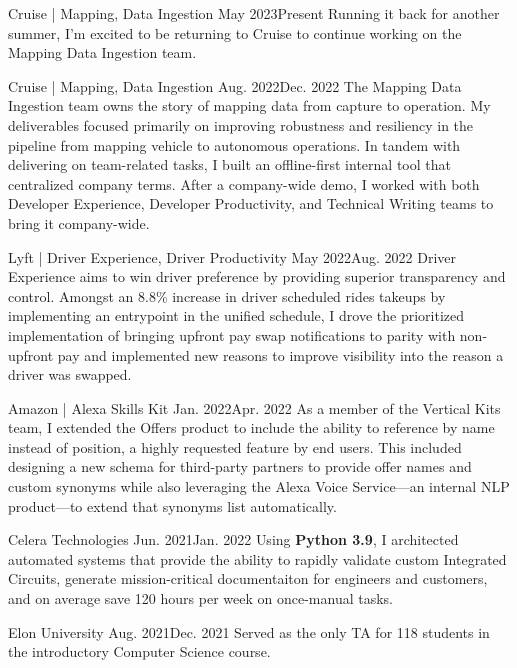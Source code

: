 \documentclass{listofpersonalprofessionalachievements}
\begin{document}
\begin{itemize}
    {Cruise | Mapping, Data Ingestion}
    {May 2023}{Present}
    {Running it back for another summer, I'm excited to be returning to Cruise to continue working on the Mapping Data Ingestion team.}

    {Cruise | Mapping, Data Ingestion}
    {Aug. 2022}{Dec. 2022}
    {The Mapping Data Ingestion team owns the story of mapping data from capture to operation. My deliverables focused primarily on improving robustness and resiliency in the pipeline from mapping vehicle to autonomous operations. In tandem with delivering on team-related tasks, I built an offline-first internal tool that centralized company terms. After a company-wide demo, I worked with both Developer Experience, Developer Productivity, and Technical Writing teams to bring it company-wide.}

    {Lyft | Driver Experience, Driver Productivity}
    {May 2022}{Aug. 2022}
    {Driver Experience aims to win driver preference by providing superior transparency and control. Amongst an 8.8\% increase in driver scheduled rides takeups by implementing an entrypoint in the unified schedule, I drove the prioritized implementation of bringing upfront pay swap notifications to parity with non-upfront pay and implemented new reasons to improve visibility into the reason a driver was swapped.}

    {Amazon | Alexa Skills Kit}
    {Jan. 2022}{Apr. 2022}
    {As a member of the Vertical Kits team, I extended the Offers product to include the ability to reference by name instead of position, a highly requested feature by end users. This included designing a new schema for third-party partners to provide offer names and custom synonyms while also leveraging the Alexa Voice Service—an internal NLP product—to extend that synonyms list automatically.}

    {Celera Technologies}
    {Jun. 2021}{Jan. 2022}
    {Using \textbf{Python 3.9}, I architected automated systems that provide the ability to rapidly validate custom Integrated Circuits, generate mission-critical documentaiton for engineers and customers, and on average save 120 hours per week on once-manual tasks.}

    {Elon University}
    {Aug. 2021}{Dec. 2021}
    {Served as the only TA for 118 students in the introductory Computer Science course.}


\end{itemize}
\end{document}
